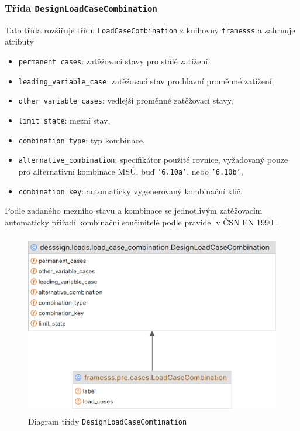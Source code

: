 \subsubsection*{Třída \texttt{DesignLoadCaseCombination}}
Tato třída rozšiřuje třídu \texttt{LoadCaseCombination} z knihovny \texttt{framesss} a zahrnuje atributy
\begin{itemize}
    \item \texttt{permanent\_cases}: zatěžovací stavy pro stálé zatížení,
    \item \texttt{leading\_variable\_case}: zatěžovací stav pro hlavní proměnné zatížení,
    \item \texttt{other\_variable\_cases}: vedlejší proměnné zatěžovací stavy,
    \item \texttt{limit\_state}: mezní stav,
    \item \texttt{combination\_type}: typ kombinace,
    \item \texttt{alternative\_combination}: specifikátor použité rovnice, vyžadovaný pouze pro alternativní kombinace MSÚ, buď \texttt{'6.10a'}, nebo \texttt{'6.10b'}, 
    \item \texttt{combination\_key}: automaticky vygenerovaný kombinační klíč.
\end{itemize}

Podle zadaného mezního stavu a kombinace se jednotlivým zatěžovacím automaticky přiřadí kombinační součinitelé podle pravidel v ČSN EN 1990 \cite{EN1990}.

\begin{figure}[H]
    \includegraphics[height=8cm]{assets/figures/desssign/load_combinations.png}
    \caption{Diagram třídy \texttt{DesignLoadCaseComtination}}
    \label{fig:class_design_load_case_combination}
\end{figure}

